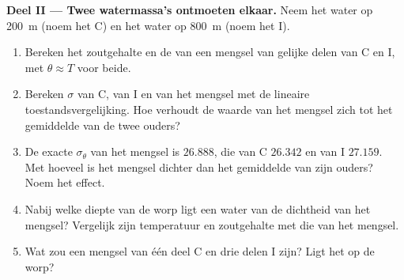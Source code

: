 \begin{problem}
\medskip
\noindent\textbf{Deel II --- Twee watermassa's ontmoeten elkaar.} Neem het water op
\qty{200}{m} (noem het C) en het water op \qty{800}{m} (noem het I).
\begin{enumerate}[resume]
  \item Bereken het zoutgehalte en de  van een mengsel van gelijke delen van C en I, met $\theta \approx T$ voor beide.
  \item Bereken $\sigma$ van C, van I en van het mengsel met de lineaire toestandsvergelijking. Hoe verhoudt de waarde van het mengsel zich tot het gemiddelde van de twee ouders?
  \item De exacte $\sigma_\theta$ van het mengsel is $26.888$, die van C $26.342$ en van I $27.159$. Met hoeveel is het mengsel dichter dan het gemiddelde van zijn ouders? Noem het effect.
  \item Nabij welke diepte van de worp ligt een water van de dichtheid van het mengsel? Vergelijk zijn temperatuur en zoutgehalte met die van het mengsel.
  \item Wat zou een mengsel van één deel C en drie delen I zijn? Ligt het op de worp?
\end{enumerate}


\end{problem}
